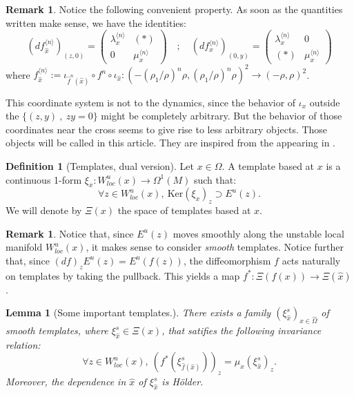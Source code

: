 \documentclass[a4paper]{article}
\newtheorem{lemma}[theorem]{Lemma}
\theoremstyle{definition}
\newtheorem{definition}{Definition}[section]
\newtheorem{remark}[example]{Remark}
\begin{document}
\begin{remark}\label{rem:temp}
Notice the following convenient property. As soon as the quantities written make sense, we have the identities:
$$ (df^{\langle n \rangle}_{\widehat{x}})_{(z,0)} = \begin{pmatrix} \lambda_x^{\langle n \rangle} & (*) \\ 0 & \mu_x^{\langle n \rangle} \end{pmatrix} \quad  ; \quad (df_x^{\langle n \rangle})_{(0,y)} = \begin{pmatrix} \lambda_x^{\langle n \rangle} & 0 \\ (*) & \mu_x^{\langle n \rangle} \end{pmatrix}$$
where $f_{\widehat{x}}^{\langle n \rangle} := \iota_{\widehat{f}^{n}({\widehat{x}})} \circ f^n \circ \iota_{\widehat{x}} : (-(\rho_1/\rho)^n \rho,(\rho_1/\rho)^n \rho)^2 \longrightarrow (-\rho, \rho)^2$.
\end{remark}

This coordinate system is not  to the dynamics, since the behavior of $\iota_x$ outside the  $\{ (z,y) \ , \ zy=0 \}$ might be completely arbitrary. But the behavior of those coordinates near the cross seems to give rise to less arbitrary objects. Those objects will be called  in this article. They are inspired from the  appearing in \cite{TZ20}.

\begin{definition}[Templates, dual version]
Let $x \in \Omega$. A template based at $x$ is a continuous 1-form $\xi_x:W^u_{loc}(x) \rightarrow \Omega^1(M)$ such that:
$$ \forall z \in W^u_{loc}(x), \ \text{Ker}(\xi_x)_z \supset E^u(z). $$
We will denote by $\Xi(x)$ the space of templates based at $x$.
\end{definition}

\begin{remark}
Notice that, since $E^u(z)$ moves smoothly along the unstable local manifold $W^u_{loc}(x)$, it makes sense to consider \emph{smooth} templates. Notice further that, since $(df)_z E^u(z) = E^u(f(z))$, the diffeomorphism $f$ acts naturally on templates by taking the pullback. This yields a map $f^* : \Xi(f(x)) \rightarrow \Xi(\widehat{x})$.
\end{remark}

\begin{lemma}[Some important templates.]
There exists a family $(\xi_{\widehat{x}}^s)_{{\widehat{x}} \in \widehat{\Omega}}$ of smooth templates, where $\xi_{\widehat{x}}^s \in \Xi(x)$, that satifies the following invariance relation:
$$\forall z \in W^u_{loc}(x), \ (f^* (\xi_{\widehat{f}(\widehat{x})}^s))_{z} = \mu_x (\xi_{\widehat{x}}^s)_{z} .$$
Moreover, the dependence in $\widehat{x}$ of $\xi_{\widehat{x}}^s$ is Hölder.
\end{lemma}
\end{document}
